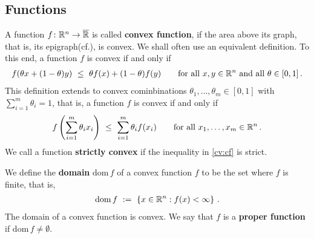 \subsection*{Functions}
A function 
$
f
\colon
\mathbb{R}^n
\to
\overline{\mathbb{R}}
$
is called \textbf{convex function}, if the area above its graph, that is, its epigraph(cf.\cite[§2.4.1]{Mordukhovich2022}), is convex. We shall often use an equivalent definition.
To this end, 
a function $f$ is convex if and only if 
\begin{gather}
  \label{cv:cf}
  f(\theta x + (1-\theta)y)
  \ 
  \le
  \ 
  \theta f(x)
  +
  (1-\theta)f(y)
  \qquad
  \text{for all}\ 
  x,y\in \R^n
  \ 
  \text{and all}\ 
  \theta\in[0,1]
  \,.
\end{gather}
This definition extends to convex cominbinations
$
  \theta_1,\ldots,\theta_m\in[0,1]
$
with
$
  \sum_{i=1}^{m} 
  \theta_i
  =1
$, that is, 
a function $f$ is convex if and only if 
\begin{gather}
  f
  \left( 
    \sum_{i=1}^{m} 
    \theta_i
    x_i
  \right)
  \ 
  \le
  \ 
    \sum_{i=1}^{m} 
    \theta_i
    f(x_i)
  \qquad
  \text{for all}\ 
  x_1,\ldots,x_m\in \R^n
  \,.
\end{gather}
We call a function \textbf{strictly convex} if the inequality in
\eqref{cv:cf} is strict.

We define the \textbf{domain} $\mathrm{dom}\,f$
of a convex function $f$ to be the set where $f$ is finite, that is,
\begin{gather}
  \mathrm{dom}\,f
  \ 
  :=
  \ 
  \left\{ 
x\in\R^n
:
f(x)<\infty
  \right\}
  \,.
\end{gather}
The domain of a convex function is convex. 
We say that $f$ is a \textbf{proper function} if  $\mathrm{dom}\,f\neq\emptyset$. 

